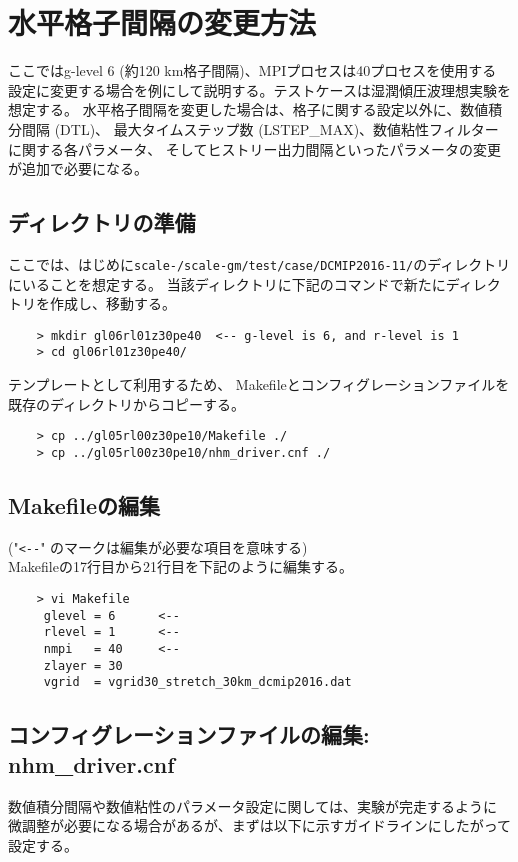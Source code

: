 \section{水平格子間隔の変更方法}
 \noindent ここではg-level 6 (約120 km格子間隔)、MPIプロセスは40プロセスを使用する
設定に変更する場合を例にして説明する。テストケースは湿潤傾圧波理想実験を想定する。
水平格子間隔を変更した場合は、格子に関する設定以外に、数値積分間隔 (DTL)、
最大タイムステップ数 (LSTEP\_MAX)、数値粘性フィルターに関する各パラメータ、
そしてヒストリー出力間隔といったパラメータの変更が追加で必要になる。

\subsection{ディレクトリの準備}
 ここでは、はじめに\texttt{scale-{\version}/scale-gm/test/case/DCMIP2016-11/}のディレクトリにいることを想定する。
当該ディレクトリに下記のコマンドで新たにディレクトリを作成し、移動する。
 \begin{verbatim}
    > mkdir gl06rl01z30pe40  <-- g-level is 6, and r-level is 1
    > cd gl06rl01z30pe40/
 \end{verbatim}

 \noindent テンプレートとして利用するため、
  Makefileとコンフィグレーションファイルを既存のディレクトリからコピーする。
 \begin{verbatim}
    > cp ../gl05rl00z30pe10/Makefile ./
    > cp ../gl05rl00z30pe10/nhm_driver.cnf ./
 \end{verbatim}

\subsection{Makefileの編集}
 ("\verb|<--|" のマークは編集が必要な項目を意味する) \\
 Makefileの17行目から21行目を下記のように編集する。
 \begin{verbatim}
    > vi Makefile
     glevel = 6      <--
     rlevel = 1      <--
     nmpi   = 40     <--
     zlayer = 30
     vgrid  = vgrid30_stretch_30km_dcmip2016.dat
 \end{verbatim}

\subsection{コンフィグレーションファイルの編集: nhm\_driver.cnf}
 \noindent 数値積分間隔や数値粘性のパラメータ設定に関しては、実験が完走するように
 微調整が必要になる場合があるが、まずは以下に示すガイドラインにしたがって設定する。

